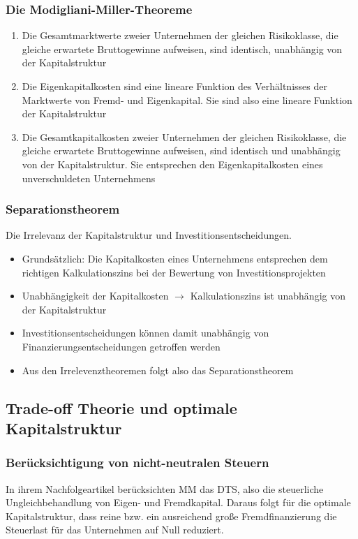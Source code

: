 \subsubsection{Die Modigliani-Miller-Theoreme}
\begin{enumerate}
	\item Die Gesamtmarktwerte zweier Unternehmen der gleichen Risikoklasse, die gleiche erwartete Bruttogewinne aufweisen, sind identisch, unabhängig von der Kapitalstruktur
	\item Die Eigenkapitalkosten sind eine lineare Funktion des Verhältnisses der Marktwerte von Fremd- und Eigenkapital. Sie sind also eine lineare Funktion der Kapitalstruktur
	\item Die Gesamtkapitalkosten zweier Unternehmen der gleichen Risikoklasse, die gleiche erwartete Bruttogewinne aufweisen, sind identisch und unabhängig von der Kapitalstruktur. Sie entsprechen den Eigenkapitalkosten eines unverschuldeten Unternehmens
\end{enumerate}

\subsubsection{Separationstheorem}
Die Irrelevanz der Kapitalstruktur und Investitionsentscheidungen.
\begin{itemize}
	\item Grundsätzlich: Die Kapitalkosten eines Unternehmens entsprechen dem richtigen Kalkulationszins bei der Bewertung von Investitionsprojekten
	\item Unabhängigkeit der Kapitalkosten $\rightarrow$ Kalkulationszins ist unabhängig von der Kapitalstruktur
	\item Investitionsentscheidungen können damit unabhängig von Finanzierungsentscheidungen getroffen werden
	\item Aus den Irrelevenztheoremen folgt also das Separationstheorem
\end{itemize}


\subsection{Trade-off Theorie und optimale Kapitalstruktur}

\subsubsection{Berücksichtigung von nicht-neutralen Steuern}
In ihrem Nachfolgeartikel berücksichten MM das DTS, also die steuerliche Ungleichbehandlung von Eigen- und Fremdkapital. Daraus folgt für die optimale Kapitalstruktur, dass reine bzw. ein ausreichend große Fremdfinanzierung die Steuerlast für das Unternehmen auf Null reduziert.


